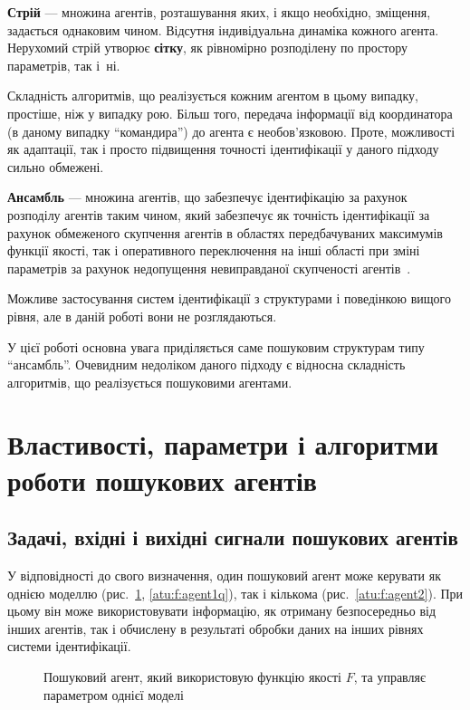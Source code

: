 \textbf{Стрій} --- множина агентів, розташування яких, і якщо необхідно,
зміщення, задається однаковим чином. Відсутня індивідуальна динаміка кожного
агента. Нерухомий стрій утворює \textbf{сітку},
як рівномірно розподілену по простору параметрів, так і~ні.

Складність алгоритмів, що реалізується кожним агентом в цьому
випадку, простіше, ніж у випадку рою. Більш того, передача
інформації від координатора (в даному випадку ``командира'')
до агента є необов'язковою. Проте, можливості як адаптації, так
і просто підвищення точності ідентифікації у даного підходу
сильно обмежені.

\textbf {Ансамбль} ---
множина агентів, що забезпечує ідентифікацію за рахунок розподілу агентів таким
чином, який забезпечує як точність ідентифікації за рахунок обмеженого
скупчення агентів в областях передбачуваних максимумів функції якості, так і оперативного
переключення на інші області при зміні параметрів за рахунок недопущення
невиправданої скупченості агентів~\cite{atu_ric2016}.

Можливе застосування систем ідентифікації з структурами
і поведінкою вищого рівня, але в даній роботі вони не
розглядаються.

У цієї роботі основна увага приділяється саме пошуковим структурам типу
``ансамбль''. Очевидним недоліком даного підходу є відносна складність
алгоритмів, що реалізується пошуковими агентами.



\section{Властивості, параметри і алгоритми роботи пошукових агентів} %

\subsection{Задачі, вхідні і вихідні сигнали пошукових агентів} %

У відповідності до свого визначення, один пошуковий агент може керувати як
однією моделлю (рис.~\ref{atu:f:agent1}, \ref{atu:f:agent1q}),
так і кількома (рис.~\ref{atu:f:agent2}). При цьому він
може використовувати інформацію, як отриману безпосередньо від інших агентів,
так і обчислену в результаті обробки даних на інших рівнях системи
ідентифікації.

\begin{figure}[htb!]
\begin{center}

\end{center}
\caption{Пошуковий агент, який використовую функцію якості $F$, та управляє параметром однієї моделі}
\label{atu:f:agent1}
\end{figure}


